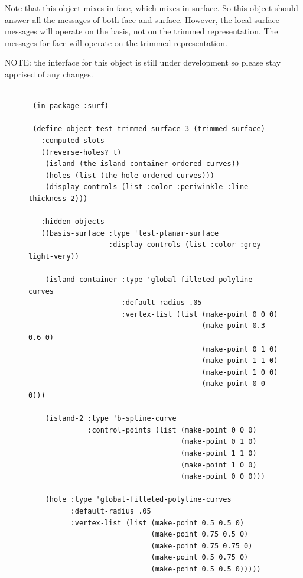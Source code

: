 \documentclass [11pt]{book}
\begin{document}
\begin{itemize}
\begin{description}
Note that this object mixes in face, which mixes in surface. So this object should answer all the messages
of both face and surface. However, the local surface messages will operate on the basis, not on the trimmed 
representation. The messages for face will operate on the trimmed representation.






NOTE: the interface for this object is still under development so please stay apprised of any changes.





\end{description}




\begin{figure}
\begin{lrbox}{\boxedverb}
\begin{minipage}{\linewidth}
{\small

\begin{verbatim}

 (in-package :surf)
                  
 (define-object test-trimmed-surface-3 (trimmed-surface)
   :computed-slots
   ((reverse-holes? t)
    (island (the island-container ordered-curves))
    (holes (list (the hole ordered-curves)))
    (display-controls (list :color :periwinkle :line-thickness 2)))
  
   :hidden-objects
   ((basis-surface :type 'test-planar-surface
                   :display-controls (list :color :grey-light-very))
   
    (island-container :type 'global-filleted-polyline-curves
                      :default-radius .05
                      :vertex-list (list (make-point 0 0 0)
                                         (make-point 0.3 0.6 0)
                                         (make-point 0 1 0)
                                         (make-point 1 1 0)
                                         (make-point 1 0 0)
                                         (make-point 0 0 0)))
   
    (island-2 :type 'b-spline-curve 
              :control-points (list (make-point 0 0 0)
                                    (make-point 0 1 0)
                                    (make-point 1 1 0)
                                    (make-point 1 0 0)
                                    (make-point 0 0 0)))
   
    (hole :type 'global-filleted-polyline-curves
          :default-radius .05
          :vertex-list (list (make-point 0.5 0.5 0)
                             (make-point 0.75 0.5 0)
                             (make-point 0.75 0.75 0)
                             (make-point 0.5 0.75 0)
                             (make-point 0.5 0.5 0)))))


\end{verbatim}}
\end{minipage}
\end{lrbox}
\end{figure}
\end{itemize}
\end{document}
